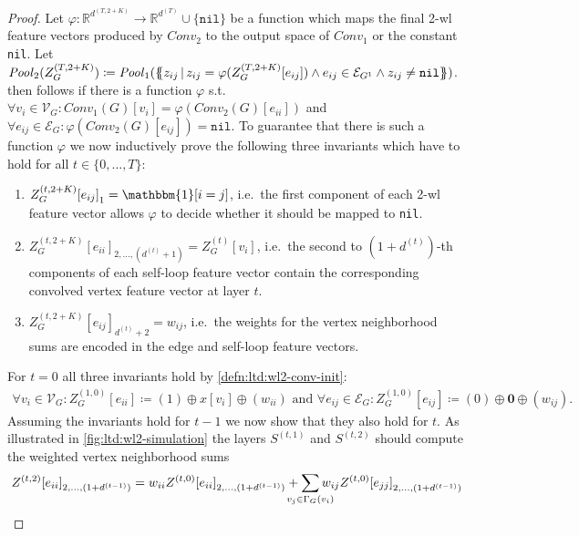 \begin{proof}
	Let $\varphi: \mathbb{R}^{d^{(T, 2 + K)}} \to \mathbb{R}^{d^{(T)}} \cup \{ \texttt{nil} \}$ be a function which maps the final 2-\acs{wl} feature vectors produced by $\mathit{Conv}_2$ to the output space of $\mathit{Conv}_1$ or the constant \texttt{nil}.
	Let $\mathit{Pool}_2(Z_G^{(T,2+K)}) \coloneqq \mathit{Pool}_1(\ldblbrace z_{ij}\, |\, z_{ij} = \varphi(Z_G^{(T,2+K)}[e_{ij}]) \land e_{ij} \in \mathcal{E}_{G^1} \land z_{ij} \neq \texttt{nil} \rdblbrace)$.
	 then follows if there is a function $\varphi$ s.t.\ $\forall v_i \in \mathcal{V}_G: \mathit{Conv}_1(G)[v_i] = \varphi(\mathit{Conv}_2(G)[e_{ii}])$ and $\forall e_{ij} \in \mathcal{E}_G: \varphi(\mathit{Conv}_2(G)[e_{ij}]) = \texttt{nil}$.
	To guarantee that there is such a function $\varphi$ we now inductively prove the following three invariants which have to hold for all $t \in \{ 0, \dots, T \}$:
	\begin{enumerate}[label={(P\arabic*)}]
		\item\label{inv:ltd:wl2-simulation:indicator}
			${Z_G^{(t,2+K)}[e_{ij}]}_1 = \mathbbm{1}[i = j]$, i.e.\ the first component of each 2-\acs{wl} feature vector allows $\varphi$ to decide whether it should be mapped to \texttt{nil}.
		\item\label{inv:ltd:wl2-simulation:feature}
			${Z_G^{(t,2+K)}[e_{ii}]}_{2, \dots, (d^{(t)} + 1)} = Z_G^{(t)}[v_{i}]$, i.e.\ the second to $(1 + d^{(t)})$-th components of each self-loop feature vector contain the corresponding convolved vertex feature vector at layer $t$.
		\item\label{inv:ltd:wl2-simulation:weight}
			${Z_G^{(t,2+K)}[e_{ij}]}_{d^{(t)} + 2} = w_{ij}$, i.e.\ the weights for the vertex neighborhood sums are encoded in the edge and self-loop feature vectors.
	\end{enumerate}
	For $t = 0$ all three invariants hold by \cref{defn:ltd:wl2-conv-init}:
	\begin{align*}
		\forall v_i \in \mathcal{V}_G: Z_G^{(1, 0)}[e_{ii}] \coloneqq (1) \oplus x[v_i] \oplus (w_{ii})
		\text{ and }
		\forall e_{ij} \in \mathcal{E}_G: Z_G^{(1, 0)}[e_{ij}] \coloneqq (0) \oplus \mathbf{0} \oplus (w_{ij})
		\text{.}
	\end{align*}
	Assuming the invariants hold for $t - 1$ we now show that they also hold for $t$.
	As illustrated in \cref{fig:ltd:wl2-simulation} the layers $S^{(t, 1)}$ and $S^{(t, 2)}$ should compute the weighted vertex neighborhood sums
	\begin{align*}
		{Z^{(t, 2)}[e_{ii}]}_{2, \dots, (1+d^{(t-1)})} = w_{ii} {Z^{(t, 0)}[e_{ii}]}_{2, \dots, (1+d^{(t-1)})} + \smashoperator[lr]{\sum_{v_j \in \Gamma_G(v_i)}} w_{ij} {Z^{(t, 0)}[e_{jj}]}_{2, \dots, (1+d^{(t-1)})}

\end{align*}
\end{proof}

